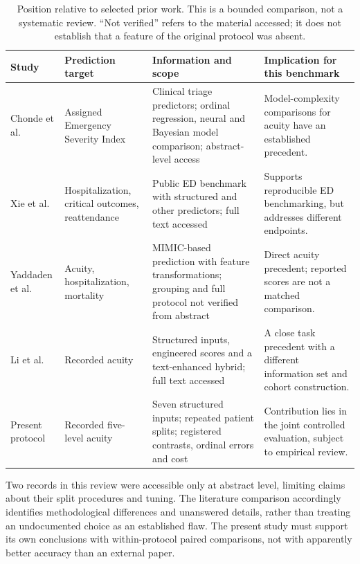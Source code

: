 \begin{table}[t]
\caption{Position relative to selected prior work. This is a bounded comparison,
not a systematic review. ``Not verified'' refers to the material accessed;
it does not establish that a feature of the original protocol was absent.}
\label{tab:related}
\begin{tabular}{@{}p{}p{}p{}p{}@{}}
\toprule
Study & Prediction target & Information and scope & Implication for this benchmark \\
\midrule
Chonde et al.~\cite{chonde2013comparison} & Assigned Emergency Severity Index & Clinical triage predictors; ordinal regression, neural and Bayesian model comparison; abstract-level access & Model-complexity comparisons for acuity have an established precedent. \\
Xie et al.~\cite{xie2022benchmark} & Hospitalization, critical outcomes, reattendance & Public ED benchmark with structured and other predictors; full text accessed & Supports reproducible ED benchmarking, but addresses different endpoints. \\
Yaddaden et al.~\cite{scc2023prediagnosis} & Acuity, hospitalization, mortality & MIMIC-based prediction with feature transformations; grouping and full protocol not verified from abstract & Direct acuity precedent; reported scores are not a matched comparison. \\
Li et al.~\cite{li2025hybrid} & Recorded acuity & Structured inputs, engineered scores and a text-enhanced hybrid; full text accessed & A close task precedent with a different information set and cohort construction. \\
Present protocol & Recorded five-level acuity & Seven structured inputs; repeated patient splits; registered contrasts, ordinal errors and cost & Contribution lies in the joint controlled evaluation, subject to empirical review. \\
\bottomrule
\end{tabular}
\end{table}

Two records in this review were accessible only at abstract level, limiting
claims about their split procedures and tuning. The literature comparison
accordingly identifies methodological differences and unanswered details,
rather than treating an undocumented choice as an established flaw. The
present study must support its own conclusions with within-protocol paired
comparisons, not with apparently better accuracy than an external paper.

